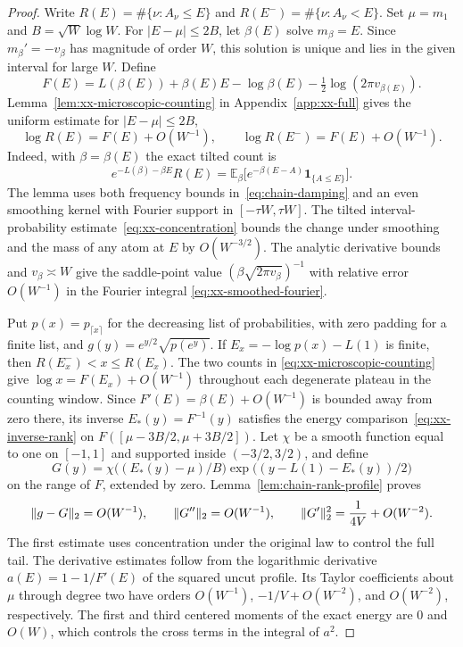 \begin{proof}
Write $R(E)=\#\{\nu:A_\nu\le E\}$ and
$R(E^-)=\#\{\nu:A_\nu<E\}$. Set $\mu=m_1$ and $B=\sqrt W\log W$.
For $|E-\mu|\le2B$, let $\beta(E)$ solve $m_\beta=E$. Since
$m_\beta'=-v_\beta$ has magnitude of order $W$, this solution is unique
and lies in the given interval for large $W$. Define
\begin{equation}\label{eq:xx-saddle-F}
 F(E)=L(\beta(E))+\beta(E)E-\log\beta(E)
      -\tfrac12\log(2\pi v_{\beta(E)}).
\end{equation}
Lemma~\ref{lem:xx-microscopic-counting} in Appendix~\ref{app:xx-full}
gives the uniform estimate for $|E-\mu|\le2B$,
\begin{equation}\label{eq:xx-microscopic-counting}
 \log R(E)=F(E)+O(W^{-1}),\qquad
 \log R(E^-)=F(E)+O(W^{-1}).
\end{equation}
Indeed, with $\beta=\beta(E)$ the exact tilted count is
\[
 e^{-L(\beta)-\beta E} R(E)=\mathbb E_\beta
      \bigl[e^{-\beta(E-A)}\mathbf1_{\{A\le E\}}\bigr].
\]
The lemma uses both frequency bounds in~\eqref{eq:chain-damping} and
an even smoothing kernel with Fourier support in $[-\tau W,\tau W]$.
The tilted interval-probability estimate~\eqref{eq:xx-concentration}
bounds the change under smoothing and the mass of any atom at $E$
by $O(W^{-3/2})$. The analytic derivative bounds and $v_\beta\asymp W$
give the saddle-point value $(\beta\sqrt{2\pi v_\beta})^{-1}$ with
relative error $O(W^{-1})$ in the Fourier integral
\eqref{eq:xx-smoothed-fourier}.

Put $p(x)=p_{\lceil x\rceil}$ for the decreasing list of probabilities,
with zero padding for a finite list, and $g(y)=e^{y/2}\sqrt{p(e^y)}$.
If $E_x=-\log p(x)-L(1)$ is finite, then
$R(E_x^-)<x\le R(E_x)$. The two counts in
\eqref{eq:xx-microscopic-counting} give $\log x=F(E_x)+O(W^{-1})$
throughout each degenerate plateau in the counting window.
Since $F'(E)=\beta(E)+O(W^{-1})$ is bounded away from zero there,
its inverse $E_*(y)=F^{-1}(y)$ satisfies the energy
comparison~\eqref{eq:xx-inverse-rank} on
$F([\mu-3B/2,\mu+3B/2])$. Let $\chi$ be a smooth function equal to one
on $[-1,1]$ and supported inside $(-3/2,3/2)$, and define
\[
 G(y)=\chi\bigl((E_*(y)-\mu)/B\bigr)
        \exp\bigl((y-L(1)-E_*(y))/2\bigr)
\]
on the range of $F$, extended by zero. Lemma~\ref{lem:chain-rank-profile}
proves
\begin{equation}\label{eq:chain-profile-estimates}
 \lVert g-G\rVert_2=O(W^{-1}),\qquad \lVert G''\rVert_2=O(W^{-1}),\qquad
 \lVert G'\rVert_2^2=\frac{1}{4V}+O(W^{-2}).
\end{equation}
The first estimate uses concentration under the original law to control
the full tail. The derivative estimates follow from the logarithmic
derivative $a(E)=1-1/F'(E)$ of the squared uncut profile. Its Taylor
coefficients about $\mu$ through degree two have orders
$O(W^{-1})$, $-1/V+O(W^{-2})$, and $O(W^{-2})$, respectively.
The first and third centered moments of the exact energy are $0$ and
$O(W)$, which controls the cross terms in the integral of $a^2$.


\end{proof}
